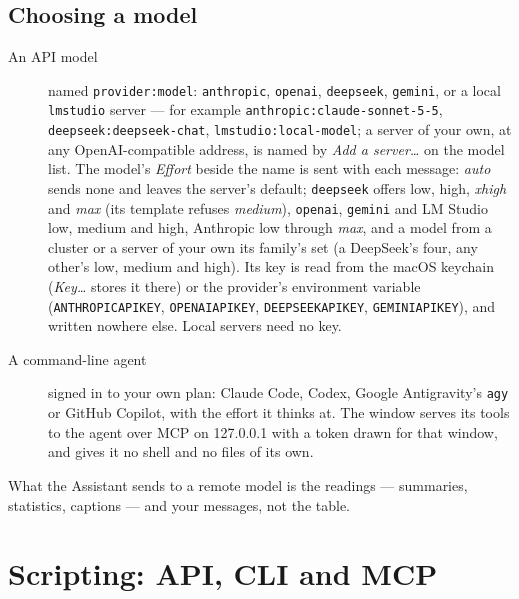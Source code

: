 \documentclass[11pt]{report}
\newcommand{\codeunderscore}{\textunderscore\allowbreak}
\newcommand{\code}[1]{\texttt{\let\_\codeunderscore #1}}
\begin{document}
\section{Choosing a model}
\begin{description}
  \item[An API model] named \code{provider:model}: \code{anthropic}, \code{openai},
        \code{deepseek}, \code{gemini}, or a local \code{lmstudio} server --- for
        example \code{anthropic:claude-sonnet-5-5}, \code{deepseek:deepseek-chat},
        \code{lmstudio:local-model}; a server of your own, at any OpenAI-compatible
        address, is named by \emph{Add a server\ldots} on the model list. The model's
        \emph{Effort} beside the name is sent with each message: \emph{auto} sends none
        and leaves the server's default; \code{deepseek} offers low, high, \emph{xhigh}
        and \emph{max} (its template refuses \emph{medium}), \code{openai}, \code{gemini}
        and LM Studio low, medium and high, Anthropic low through \emph{max}, and a model
        from a cluster or a server of your own its family's set (a DeepSeek's four, any
        other's low, medium and high). Its key is
        read from the
        macOS keychain (\emph{Key\ldots} stores it there) or the provider's environment
        variable (\code{ANTHROPIC\_API\_KEY}, \code{OPENAI\_API\_KEY},
        \code{DEEPSEEK\_API\_KEY}, \code{GEMINI\_API\_KEY}), and written nowhere else.
        Local servers need no key.
  \item[A command-line agent] signed in to your own plan: Claude Code, Codex, Google
        Antigravity's \code{agy} or GitHub Copilot, with the effort it thinks at. The
        window serves its tools to the agent over MCP on 127.0.0.1 with a token drawn for
        that window, and gives it no shell and no files of its own.
\end{description}
What the Assistant sends to a remote model is the readings --- summaries, statistics,
captions --- and your messages, not the table.

\chapter{Scripting: API, CLI and MCP}\label{ch:script}
\end{document}
